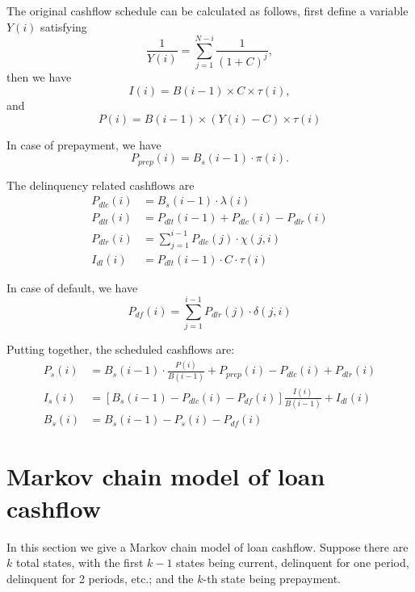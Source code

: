 The original cashflow schedule can be calculated as follows, first define a
variable $Y(i)$ satisfying
\[
  \frac{1}{Y(i)} = \sum_{j=1}^{N-i} \frac{1}{(1+C)^j},
\]
then we have
\begin{equation}
  I(i) = B(i-1)\times C\times \tau(i),
\end{equation}
and
\begin{equation}
  P(i) = B(i-1)\times (Y(i)-C)\times \tau(i)
\end{equation}

In case of prepayment, we have
\begin{equation}
  P_{prep}(i) = B_s(i-1) \cdot \pi(i).
\end{equation}

The delinquency related cashflows are
\begin{align}
  P_{dlc}(i) &= B_s(i-1) \cdot \lambda(i) \\ 
  P_{dlt}(i) &= P_{dlt}(i-1) + P_{dlc}(i) - P_{dlr}(i) \\ 
  P_{dlr}(i) &= \sum_{j=1}^{i-1} P_{dlc}(j) \cdot \chi(j,i) \\ 
  I_{dl}(i) &= P_{dlt}(i-1) \cdot C \cdot \tau(i)
\end{align}

In case of default, we have
\begin{equation}
  P_{df}(i) = \sum_{j=1}^{i-1} P_{dlr}(j) \cdot \delta(j,i) 
\end{equation}

Putting together, the scheduled cashflows are:
\begin{align}
  P_s(i) &= B_s(i-1)\cdot\frac{P(i)}{B(i-1)} + P_{prep}(i) - P_{dlc}(i) + P_{dlr}(i) \\
  I_s(i) &= [B_s(i-1)-P_{dlc}(i)-P_{df}(i)] \frac{I(i)}{B(i-1)} + I_{dl}(i) \\
  B_s(i) &= B_s(i-1) - P_s(i) - P_{df}(i)
\end{align}

\section{Markov chain model of loan cashflow}

In this section we give a Markov chain model of loan cashflow. Suppose there are
$k$ total states, with the first $k-1$ states being current, delinquent for one
period, delinquent for 2 periods, etc.; and the $k$-th state being prepayment.


